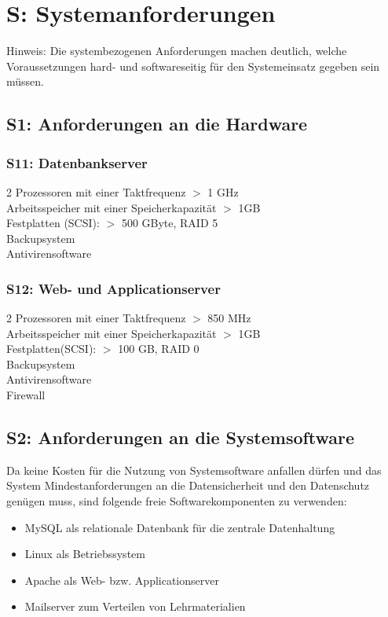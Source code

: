 \documentclass[10pt,a4paper]{scrartcl}
\begin{document}
\section{S: Systemanforderungen}
Hinweis: Die systembezogenen Anforderungen machen deutlich, welche Voraussetzungen hard- und softwareseitig für den Systemeinsatz gegeben sein müssen.

\subsection{S1: Anforderungen an die Hardware}
\subsubsection*{S11: Datenbankserver}

2 Prozessoren mit einer Taktfrequenz $>$ 1 GHz\\
Arbeitsspeicher mit einer Speicherkapazität $>$ 1GB\\
Festplatten (SCSI): $>$ 500 GByte, RAID 5\\
Backupsystem\\
Antivirensoftware

\subsubsection*{S12: Web- und Applicationserver}

2 Prozessoren mit einer Taktfrequenz $>$ 850 MHz\\
Arbeitsspeicher mit einer Speicherkapazität $>$ 1GB\\
Festplatten(SCSI): $>$ 100 GB, RAID 0\\
Backupsystem\\
Antivirensoftware\\
Firewall

\subsection{S2: Anforderungen an die Systemsoftware}
Da keine Kosten für die Nutzung von Systemsoftware anfallen dürfen und das System Mindestanforderungen an die Datensicherheit und den Datenschutz genügen muss, sind folgende freie Softwarekomponenten zu verwenden:
\begin{itemize}
\item MySQL als relationale Datenbank für die zentrale Datenhaltung
\item Linux als Betriebssystem
\item Apache als Web- bzw. Applicationserver
\item Mailserver zum Verteilen von Lehrmaterialien
\end{itemize}
\end{document}
